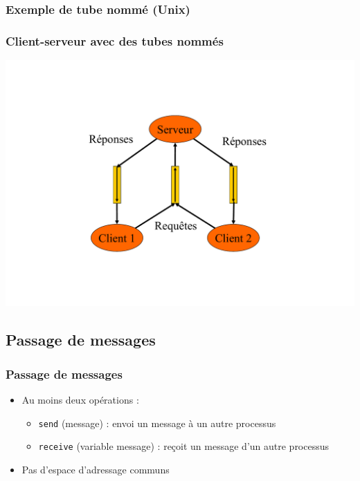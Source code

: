 \begin{frame}
\frametitle{Exemple de tube nommé (Unix)}
\begin{scriptsize}\end{scriptsize}
\end{frame}

\begin{frame}
\frametitle{Client-serveur avec des tubes nommés}
\includegraphics[height=.9\textheight]{../illustration/tube_nomme_cs.pdf}
\end{frame}

\subsection{Passage de messages}
\begin{frame}
\frametitle{Passage de messages}
\begin{itemize}
\item Au moins deux opérations :
\begin{itemize}
\item \texttt{send} (message) : envoi un message à un autre processus
\item \texttt{receive} (variable message) : reçoit un message d’un autre processus
\end{itemize}
\item Pas d’espace d’adressage communs
\end{itemize}
\end{frame}

